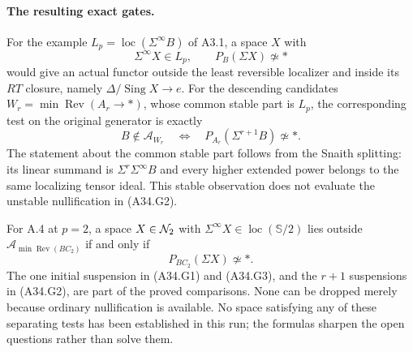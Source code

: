 \paragraph{The resulting exact gates.}
For the example $L_p=\operatorname{loc}(\Sigma^\infty B)$ of A3.1,
a space $X$ with
\[
 \Sigma^\infty X\in L_p,
 \qquad P_B(\Sigma X)\not\simeq *
 \tag{A34.G1}
\]
would give an actual functor outside the least reversible localizer
and inside its $RT$ closure, namely
$\Delta/\operatorname{Sing}X\to e$.  For the descending candidates
$W_r=\min\operatorname{Rev}(A_r\to *)$, whose common stable part is
$L_p$, the corresponding test on the original generator is exactly
\[
 B\notin\mathcal A_{W_r}
 \quad\Longleftrightarrow\quad
 P_{A_r}(\Sigma^{r+1}B)\not\simeq *.
 \tag{A34.G2}
\]
The statement about the common stable part follows from the Snaith
splitting: its linear summand is
$\Sigma^r\Sigma^\infty B$ and every higher extended power belongs
to the same localizing tensor ideal.  This stable observation does
not evaluate the unstable nullification in \textup{(A34.G2)}.

For A.4 at $p=2$, a space $X\in\mathcal N_2$ with
$\Sigma^\infty X\in\operatorname{loc}(\mathbb S/2)$ lies outside
$\mathcal A_{\min\operatorname{Rev}(BC_2)}$ if and only if
\[
                 P_{BC_2}(\Sigma X)\not\simeq *.
 \tag{A34.G3}
\]
The one initial suspension in \textup{(A34.G1)} and
\textup{(A34.G3)}, and the $r+1$ suspensions in
\textup{(A34.G2)}, are part of the proved comparisons.  None can be
dropped merely because ordinary nullification is available.
No space satisfying any of these separating tests has been established
in this run; the formulas sharpen the open questions rather than solve
them.

